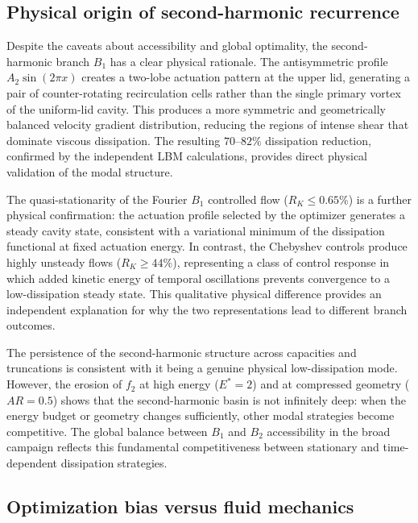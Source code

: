 \documentclass[a4paper,11pt]{article}
\begin{document}
\subsection{Physical origin of second-harmonic recurrence}

Despite the caveats about accessibility and global optimality, the second-harmonic
branch \(B_1\) has a clear physical rationale. The antisymmetric profile
\(A_2\sin(2\pi x)\) creates a two-lobe actuation pattern at the upper lid,
generating a pair of counter-rotating recirculation cells rather than the single
primary vortex of the uniform-lid cavity. This produces a more symmetric and
geometrically balanced velocity gradient distribution, reducing the regions of
intense shear that dominate viscous dissipation. The resulting \(70\)--\(82\%\)
dissipation reduction, confirmed by the independent LBM calculations, provides
direct physical validation of the modal structure.

The quasi-stationarity of the Fourier \(B_1\) controlled flow (\(R_K\le0.65\%\))
is a further physical confirmation: the actuation profile selected by the optimizer
generates a steady cavity state, consistent with a variational minimum of the
dissipation functional at fixed actuation energy. In contrast, the Chebyshev
controls produce highly unsteady flows (\(R_K\ge44\%\)), representing a class of
control response in which added kinetic energy of temporal oscillations prevents
convergence to a low-dissipation steady state. This qualitative physical difference
provides an independent explanation for why the two representations lead to
different branch outcomes.

The persistence of the second-harmonic structure across capacities and truncations
is consistent with it being a genuine physical low-dissipation mode. However,
the erosion of \(f_2\) at high energy (\(E^*=2\)) and at compressed geometry
(\(AR=0.5\)) shows that the second-harmonic basin is not infinitely deep: when
the energy budget or geometry changes sufficiently, other modal strategies become
competitive. The global balance between \(B_1\) and \(B_2\) accessibility in the
broad campaign reflects this fundamental competitiveness between stationary and
time-dependent dissipation strategies.

\subsection{Optimization bias versus fluid mechanics}
\end{document}
